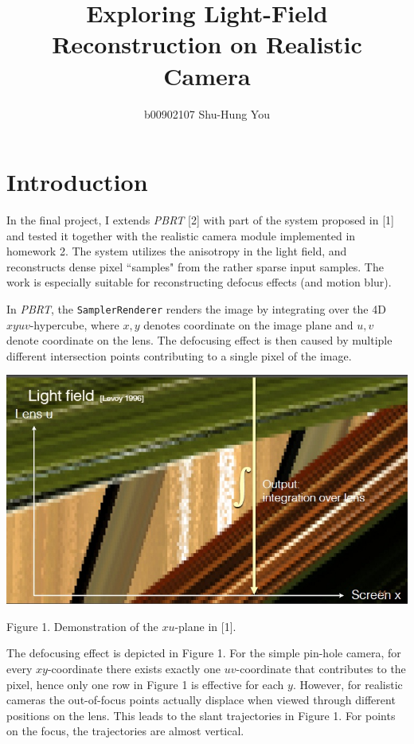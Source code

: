 \documentclass{article}
\begin{document}
\title{Exploring Light-Field Reconstruction on Realistic Camera}
\author{b00902107 Shu-Hung You}
\date{}
\maketitle
\section{Introduction}
In the final project, I extends \textit{PBRT} [2] with part of the system proposed in [1] and tested it together with the realistic camera module implemented in homework 2. The system utilizes the anisotropy in the light field, and reconstructs dense pixel ``samples" from the rather sparse input samples. The work is especially suitable for reconstructing defocus effects (and motion blur).

In \textit{PBRT}, the \texttt{SamplerRenderer} renders the image by integrating over the 4D $xyuv$-hypercube, where $x,y$ denotes coordinate on the image plane and $u,v$ denote coordinate on the lens. The defocusing effect is then caused by multiple different intersection points contributing to a single pixel of the image.

\begin{center}
  \includegraphics[scale=0.8]{./xu-plane.jpg}

  \small{Figure 1. Demonstration of the $xu$-plane in [1].}
\end{center}

The defocusing effect is depicted in Figure 1. For the simple pin-hole camera, for every $xy$-coordinate there exists exactly one $uv$-coordinate that contributes to the pixel, hence only one row in Figure 1 is effective for each $y$. However, for realistic cameras the out-of-focus points actually displace when viewed through different positions on the lens. This leads to the slant trajectories in Figure 1. For points on the focus, the trajectories are almost vertical.
\end{document}
